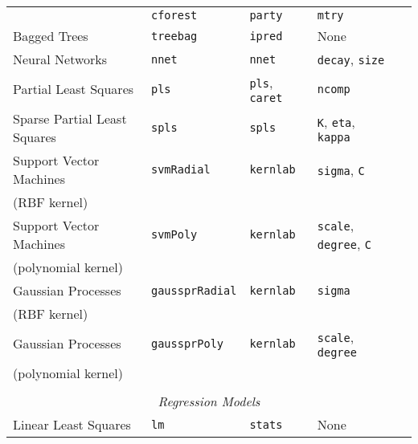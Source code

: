 \documentclass[12pt]{article}
\begin{document}
\begin{longtable}{lllll}
       & 
         \texttt{cforest} & 
            \texttt{party}       & 
            \texttt{mtry} \\     
                        
      Bagged Trees &
         \texttt{treebag} & 
            \texttt{ipred}       & 
            None \\                         
                        
      Neural Networks &               
         \texttt{nnet} & 
            \texttt{nnet}       &       
            \texttt{decay}, \texttt{size} \\      
      
      Partial Least Squares &
         \texttt{pls} & 
            \texttt{pls}, \texttt{caret}       & 
            \texttt{ncomp} \\      

      Sparse Partial Least Squares &
         \texttt{spls} & 
            \texttt{spls}       & 
            \texttt{K}, \texttt{eta}, \texttt{kappa} \\   
            
      Support Vector Machines  &
         \texttt{svmRadial} & 
            \texttt{kernlab}       & 
            \texttt{sigma}, \texttt{C} \\            
      \:\: (RBF kernel) & & &\\   
      
      Support Vector Machines  &
         \texttt{svmPoly} & 
            \texttt{kernlab}       & 
            \texttt{scale}, \texttt{degree}, \texttt{C} \\            
      \:\: (polynomial kernel) & & &\\  
     Gaussian Processes  &
         \texttt{gaussprRadial} & 
            \texttt{kernlab}       & 
            \texttt{sigma} \\            
      \:\: (RBF kernel) & & &\\   
      
      Gaussian Processes  &
         \texttt{gaussprPoly} & 
            \texttt{kernlab}       & 
            \texttt{scale}, \texttt{degree} \\            
      \:\: (polynomial kernel) & & &\\  
    
      \\
\multicolumn{5}{c}{{{ \em Regression Models}}} \\      
    
      Linear Least Squares &
         \texttt{lm} & 
            \texttt{stats}       & 
            None \\  
      

\end{longtable}
\end{document}
